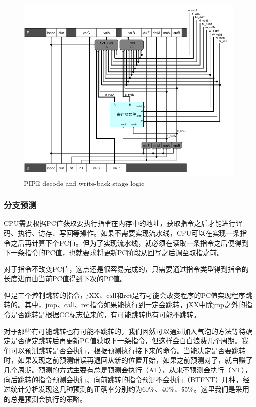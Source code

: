 \begin{figure}[htbp]
\centering
\includegraphics{img/pipe-decode.png}
\caption{PIPE decode and write-back stage logic}
\end{figure}

\subsubsection{分支预测}\label{ux5206ux652fux9884ux6d4b}

CPU需要根据PC值获取要执行指令在内存中的地址，获取指令之后才能进行译码、执行、访存、写回等操作。如果不需要实现流水线，CPU可以在实现一条指令之后再计算下个PC值。但为了实现流水线，就必须在读取一条指令之后便得到下一条指令的PC值，也就要求将更新PC阶段从回写之后调至取指之前。

对于指令不改变PC值，这点还是很容易完成的，只需要通过指令类型得到指令的长度进而由当前PC值得到下次的PC值。

但是三个控制跳转的指令，jXX、call和ret是有可能会改变程序的PC值实现程序跳转的。其中，jmp、call、ret指令如果能执行到一定会跳转，jXX中除jmp之外的指令是否跳转是根据CC标志位来的，有可能跳转也有可能不跳转。

对于那些有可能跳转也有可能不跳转的，我们固然可以通过加入气泡的方法等待确定是否确定跳转后再更新PC值获取下一条指令，但这样会白白浪费几个周期。我们可以预测跳转是否会执行，根据预测执行接下来的命令。当能决定是否要跳转时，如果发现之前预测错误再退回从新的位置开始，如果之前预测对了，就白赚了几个周期。预测的方式主要有总是预测会执行（AT），从来不预测会执行（NT），向后跳转的指令预测会执行、向前跳转的指令预测不会执行（BTFNT）几种，经过统计分析发现这几种预测的正确率分别约为60\%、40\%、65\%。这里我们是采用的总是预测会执行的策略。

